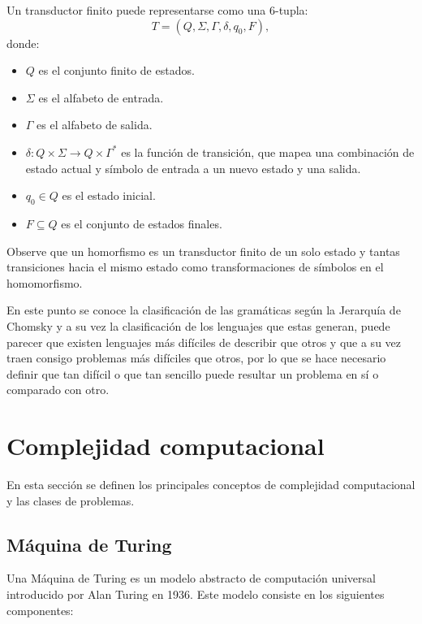 \documentclass[12pt]{article}
\begin{document}
Un transductor finito puede representarse como una 6-tupla:
\[
      T = (Q, \Sigma, \Gamma, \delta, q_0, F),
\]
donde:
\begin{itemize}
      \item \(Q\) es el conjunto finito de estados.
      \item \(\Sigma\) es el alfabeto de entrada.
      \item \(\Gamma\) es el alfabeto de salida.
      \item \(\delta: Q \times \Sigma \to Q \times \Gamma^*\) es la función de transición, que mapea una combinación de estado actual y símbolo de entrada a un nuevo estado y una salida.
      \item \(q_0 \in Q\) es el estado inicial.
      \item \(F \subseteq Q\) es el conjunto de estados finales.
\end{itemize}

Observe que un homorfismo es un transductor finito de un solo estado y tantas transiciones hacia el mismo estado como transformaciones
de símbolos en el homomorfismo.

En este punto se conoce la clasificación de las gramáticas según la Jerarquía de Chomsky 
y a su vez la clasificación de los lenguajes que estas generan, puede parecer que existen lenguajes
más difíciles de describir que otros y que a su vez traen consigo problemas más difíciles que otros, 
por lo que se hace necesario definir que tan difícil o que tan sencillo puede resultar un problema en sí 
o comparado con otro. 

\section{Complejidad computacional}

En esta sección se definen los principales conceptos de complejidad computacional y las clases de problemas.

\subsection{Máquina de Turing}

Una Máquina de Turing \cite{authomataTheory} es un modelo abstracto de computación universal introducido por Alan Turing en 1936. Este modelo consiste en los siguientes componentes:
\end{document}
